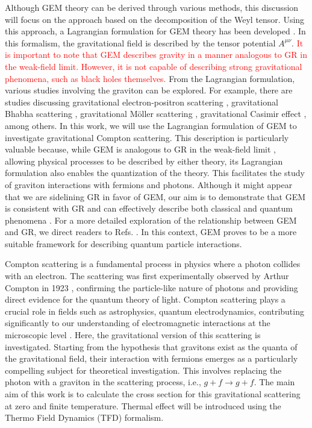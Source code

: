 \documentclass[11pt,showpacs,preprintnumbers,amsmath,amssymb,prd,nofootinbib,superscriptaddress]{revtex4-2}
\begin{document}
Although GEM theory can be derived through various methods, this discussion will focus on the approach based on the decomposition of the Weyl tensor. Using this approach, a Lagrangian formulation for GEM theory has been developed \cite{Jair}. In this formalism, the gravitational field is described by the tensor potential $A^{\mu\nu}$. \textcolor{red}{It is important to note that GEM describes gravity in a manner analogous to GR in the weak-field limit. However, it is not capable of describing strong gravitational phenomena, such as black holes themselves.} From the Lagrangian formulation, various studies involving the graviton can be explored. For example, there are studies discussing gravitational electron-positron scattering \cite{jesus2022gravitational}, gravitational Bhabha scattering \cite{santos2017gravitational}, gravitational M\"{o}ller scattering \cite{alesandrogravitacional}, gravitational Casimir effect \cite{Casimir}, among others. In this work, we will use the Lagrangian formulation of GEM to investigate gravitational Compton scattering. This description is particularly valuable because, while GEM is analogous to GR in the weak-field limit \cite{Mashhon}, allowing physical processes to be described by either theory, its Lagrangian formulation also enables the quantization of the theory. This facilitates the study of graviton interactions with fermions and photons. Although it might appear that we are sidelining GR in favor of GEM, our aim is to demonstrate that GEM is consistent with GR and can effectively describe both classical and quantum phenomena \cite{santos2017gravitational, farrugia2020gravitoelectromagnetism, chatzistavrakidis2020torsion}. For a more detailed exploration of the relationship between GEM and GR, we direct readers to Refs. \cite{alesandrogravitacional, Mashhon, bakopoulos2016gravitoelectromagnetism}. In this context, GEM proves to be a more suitable framework for describing quantum particle interactions.

Compton scattering is a fundamental process in physics where a photon collides with an electron. The scattering was first experimentally observed by Arthur Compton in 1923 \cite{Compton}, confirming the particle-like nature of photons and providing direct evidence for the quantum theory of light. Compton scattering plays a crucial role in fields such as astrophysics, quantum electrodynamics, contributing significantly to our understanding of electromagnetic interactions at the microscopic level \cite{cabral}. Here, the gravitational version of this scattering is investigated. Starting from the hypothesis that gravitons exist as the quanta of the gravitational field, their interaction with fermions emerges as a particularly compelling subject for theoretical investigation. This involves replacing the photon with a graviton in the scattering process, i.e., $g+f\xrightarrow{}g+f$. The main aim of this work is to calculate the cross section for this gravitational scattering at zero and finite temperature. Thermal effect will be introduced using the Thermo Field Dynamics (TFD) formalism.
\end{document}
